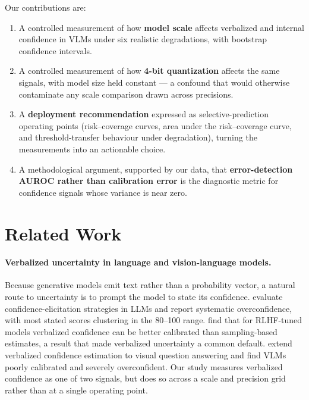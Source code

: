 \documentclass[11pt]{article}
\begin{document}
Our contributions are:
\begin{enumerate}
  \item A controlled measurement of how \textbf{model scale} affects verbalized
        and internal confidence in VLMs under six realistic degradations, with
        bootstrap confidence intervals.
  \item A controlled measurement of how \textbf{4-bit quantization} affects the
        same signals, with model size held constant --- a confound that would
        otherwise contaminate any scale comparison drawn across precisions.
  \item A \textbf{deployment recommendation} expressed as
        selective-prediction operating points (risk--coverage curves, area under
        the risk--coverage curve, and threshold-transfer behaviour under
        degradation), turning the measurements into an actionable choice.
  \item A methodological argument, supported by our data, that
        \textbf{error-detection AUROC rather than calibration error} is the
        diagnostic metric for confidence signals whose variance is near zero.
\end{enumerate}

\section{Related Work}

\paragraph{Verbalized uncertainty in language and vision-language models.}
Because generative models emit text rather than a probability vector, a natural
route to uncertainty is to prompt the model to state its confidence.
\citet{xiong2024llms} evaluate confidence-elicitation strategies in LLMs and
report systematic overconfidence, with most stated scores clustering in the
80--100 range. \citet{tian2023just} find that for RLHF-tuned models verbalized
confidence can be better calibrated than sampling-based estimates, a result that
made verbalized uncertainty a common default. \citet{groot2024overconfidence}
extend verbalized confidence estimation to visual question answering and find
VLMs poorly calibrated and severely overconfident. Our study measures verbalized
confidence as one of two signals, but does so across a scale and precision grid
rather than at a single operating point.
\end{document}
